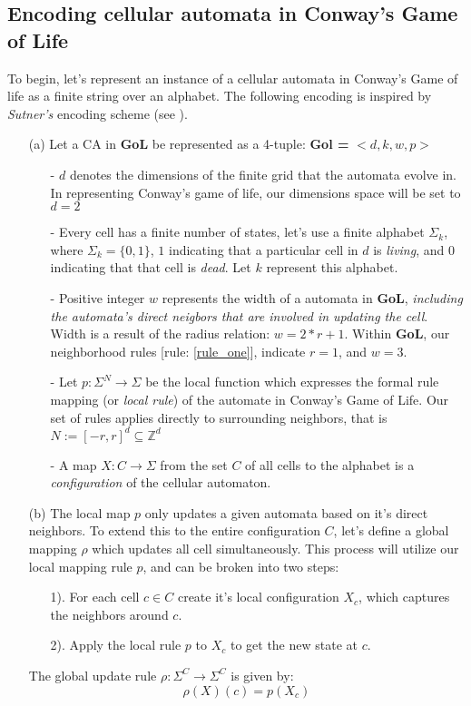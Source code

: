 \documentclass{article}
\theoremstyle{definition}
\theoremstyle{plain}
\theoremstyle{plain}
\begin{document}
\subsection{Encoding cellular automata in Conway's Game of Life}
To begin, let's represent an instance of a cellular automata in Conway's Game of life as a finite string over an alphabet. The following encoding is inspired by \textit{Sutner's} encoding scheme (see \cite{SUTNER199587}).
\begin{enumerate}
  \item[(a)] Let a CA in \textbf{GoL} be represented as a 4-tuple: \textbf{Gol = } $ <d, k, w, p> $
    \begin{enumerate}
      \item[-] $d$ denotes the dimensions of the finite grid that the automata evolve in. In representing Conway's game of life, our dimensions space will be set to $d = 2$
      \item[-] Every cell has a finite number of states, let's use a finite alphabet $\Sigma_k$, where $\Sigma_k = \{0,1\}$, $1$ indicating that a particular cell in $d$ is \textit{living}, and $0$ indicating that that cell is \textit{dead}. Let $k$ represent this alphabet.
      \item[-] Positive integer $w$ represents the width of a automata in \textbf{GoL}, \textit{including the automata's direct neigbors that are involved in updating the cell}. Width is a result of the radius relation: $w = 2*r +1$. Within \textbf{GoL}, our neighborhood rules [rule: \ref{rule_one}], indicate $r = 1$, and $w = 3$.
      \item[-] Let $p : \Sigma^N \to \Sigma$ be the local function which expresses the formal rule mapping (or \textit{local rule}) of the automate in Conway's Game of Life. Our set of rules applies directly to surrounding neighbors, that is$ N := [-r, r]^d \subseteq \mathbb{Z}^d $ 
      \item[-] A map $ X : C \to \Sigma $ from the set $ C $ of all cells to the alphabet is a \emph{configuration} of the cellular automaton.
    \end{enumerate}
      \item[(b)] The local map $p$ only updates a given automata based on it's direct neighbors. To extend this to the entire configuration $C$, let's define a global mapping $\rho$ which updates all cell simultaneously. This process will utilize our local mapping rule $p$, and  can be broken into two steps: 
        \begin{enumerate}
          \item[1).] For each cell $c \in C$ create it's local configuration $X_c$, which captures the neighbors around $c$.
          \item[2).] Apply the local rule $p$ to $X_c$ to get the new state at $c$.
        \end{enumerate}
        The global update rule $\rho : \Sigma^C \to \Sigma^C$ is  given by:
        \begin {equation}
        \rho(X)(c) = p(X_c)
        \end {equation}
\end{enumerate}
\end{document}
